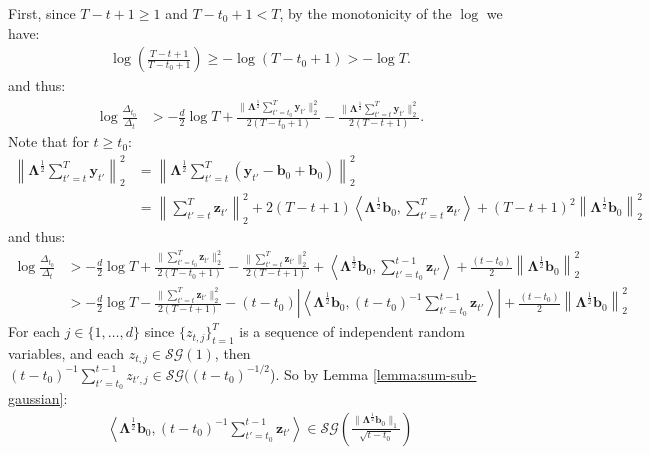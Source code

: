 \documentclass{article}
\begin{document}
First, since $T-t +1\geq 1$ and $T-t_0+1 < T$, by the monotonicity of the $\log$ we have: 
\begin{align*}
    \log \left(\frac{T-t+1}{T-t_0+1}\right) \geq -\log(T-t_0+1) > -\log T.
\end{align*}
and thus:
\begin{align*}
    \log \frac{\Delta_{t_0}}{\Delta_t} &> -\frac{d}{2} \log T + \frac{\lVert\pmb{\Lambda}^{\frac{1}{2}} \sum_{t'=t_0}^T\mathbf{y}_{t'}\rVert_2^2}{2(T-t_0+1)}- \frac{\lVert\pmb{\Lambda}^{\frac{1}{2}} \sum_{t'=t}^T\mathbf{y}_{t'}\rVert_2^2}{2(T-t+1)}.
\end{align*}
Note that for $t \geq t_0$:
\begin{align*}
    \left\lVert\pmb{\Lambda}^{\frac{1}{2}} \sum_{t'=t}^T\mathbf{y}_{t'}\right\rVert_2^2 &= \left\lVert\pmb{\Lambda}^{\frac{1}{2}} \sum_{t'=t}^T(\mathbf{y}_{t'} - \mathbf{b}_0 + \mathbf{b}_0)\right\rVert_2^2 \\
    &= \left\lVert \sum_{t'=t}^T \mathbf{z}_{t'}\right\rVert_2^2 + 2(T-t+1) \left\langle\pmb{\Lambda}^{\frac{1}{2}}\mathbf{b}_0, \sum_{t'=t}^T\mathbf{z}_{t'} \right\rangle + (T-t+1)^2\left\lVert\pmb{\Lambda}^{\frac{1}{2}}\mathbf{b}_0\right\rVert_2^2 
\end{align*}
and thus:
\begin{align*}
    \log \frac{\Delta_{t_0}}{\Delta_t} &> -\frac{d}{2} \log T + \frac{\lVert\sum_{t'=t_0}^T\mathbf{z}_{t'}\rVert_2^2}{2(T-t_0+1)} - \frac{\lVert\sum_{t'=t}^T\mathbf{z}_{t'}\rVert_2^2}{2(T-t+1)} + \left\langle\pmb{\Lambda}^{\frac{1}{2}}\mathbf{b}_0, \sum_{t'=t_0}^{t-1}\mathbf{z}_{t'} \right\rangle + \frac{(t - t_0)}{2} \left\lVert\pmb{\Lambda}^{\frac{1}{2}}\mathbf{b}_0\right\rVert_2^2 \\
    &> -\frac{d}{2} \log T - \frac{\lVert\sum_{t'=t}^T\mathbf{z}_{t'}\rVert_2^2}{2(T-t+1)} - (t-t_0)\left| \left\langle\pmb{\Lambda}^{\frac{1}{2}}\mathbf{b}_0, (t-t_0)^{-1}\sum_{t'=t_0}^{t-1}\mathbf{z}_{t'} \right\rangle\right| + \frac{(t - t_0)}{2} \left\lVert\pmb{\Lambda}^{\frac{1}{2}}\mathbf{b}_0\right\rVert_2^2
\end{align*}
For each $j \in \{1,\ldots,d\}$ since $\{z_{t,j}\}^{T}_{t=1}$ is a sequence of independent random variables, and each $z_{t,j}\in \mathcal{SG}(1)$, then $(t-t_0)^{-1}\sum_{t'=t_0}^{t-1} z_{t',j} \in \mathcal{SG}((t-t_0)^{-1/2}$). So by Lemma \ref{lemma:sum-sub-gaussian}:
\begin{align*}
     \left\langle\pmb{\Lambda}^{\frac{1}{2}}\mathbf{b}_0, (t-t_0)^{-1}\sum_{t'=t_0}^{t-1}\mathbf{z}_{t'} \right\rangle \in \mathcal{SG}\left(\frac{\lVert\pmb{\Lambda}^{\frac{1}{2}} \mathbf{b}_0\rVert_1}{\sqrt{t-t_0}}\right)
\end{align*} 
\end{document}
